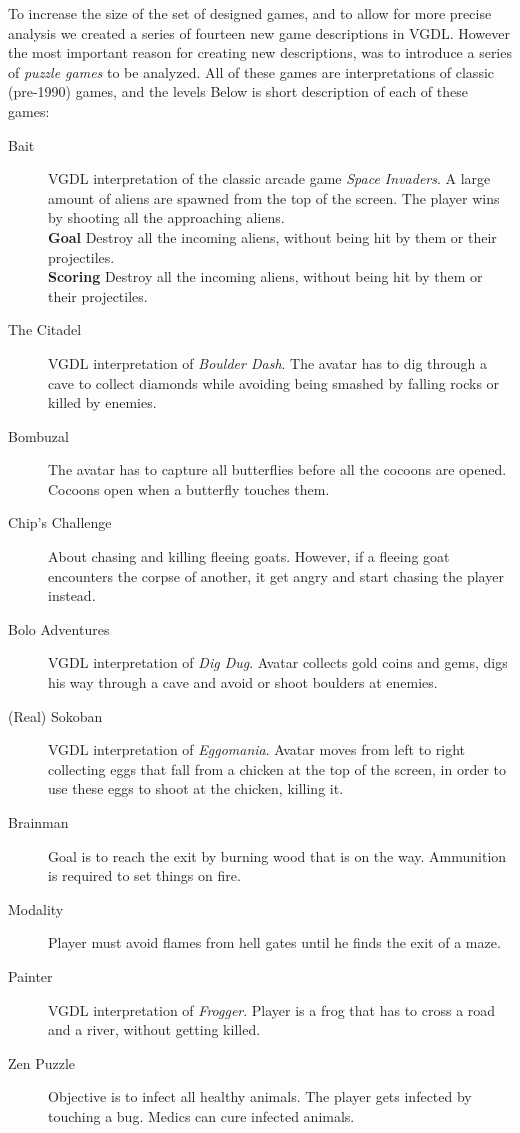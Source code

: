 \documentclass[a4paper,titlepage,final, twoside]{report}
\begin{document}
To increase the size of the set of designed games, and to allow for more precise analysis we created a series of fourteen new game descriptions in VGDL. However the most important reason for creating new descriptions, was to introduce a series of \emph{puzzle games} to be analyzed.
All of these games are interpretations of classic (pre-1990) games, and the levels 
Below is short description of each of these games:

\begin{description}
\item [Bait] VGDL interpretation of the classic arcade game \emph{Space Invaders}. A large amount of aliens are spawned from the top of the screen. The player wins by shooting all the approaching aliens.\\
\textbf{Goal} Destroy all the incoming aliens, without being hit by them or their projectiles.\\
\textbf{Scoring} Destroy all the incoming aliens, without being hit by them or their projectiles.
\item [The Citadel] VGDL interpretation of \emph{Boulder Dash}. The avatar has to dig through a cave to collect diamonds while avoiding being smashed by falling rocks or killed by enemies. 
\item [Bombuzal] The avatar has to capture all butterflies before all the cocoons are opened. Cocoons open when a butterfly touches them.
\item [Chip's Challenge] About chasing and killing fleeing goats. However, if a fleeing goat encounters the corpse of another, it get angry and start chasing the player instead.
\item [Bolo Adventures] VGDL interpretation of \emph{Dig Dug}. Avatar collects gold coins and gems, digs his way through a cave and avoid or shoot boulders at enemies.
\item [(Real) Sokoban] VGDL interpretation of \emph{Eggomania}. Avatar moves from left to right collecting eggs that fall from a chicken at the top of the screen, in order to use these eggs to shoot at the chicken, killing it.
\item [Brainman] Goal is to reach the exit by burning wood that is on the way. Ammunition is required to set things on fire.
\item [Modality] Player must avoid flames from hell gates until he finds the exit of a maze.
\item [Painter] VGDL interpretation of \emph{Frogger}. Player is a frog that has to cross a road and a river, without getting killed.
\item [Zen Puzzle] Objective is to infect all healthy animals. The player gets infected by touching a bug. Medics can cure infected animals.
\end{description}
\end{document}
